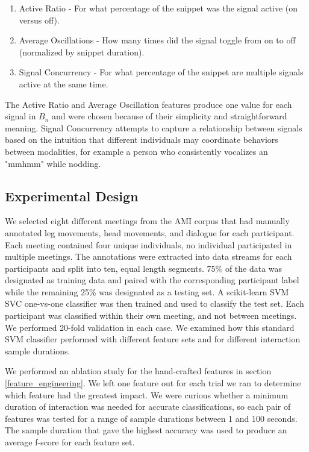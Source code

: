 \documentclass[conference]{IEEEtran}
\newcommand{\meta}[1]{{\textcolor[rgb]{0.1,0.7,0.2}{[JSS: {\it #1}]}}}
\begin{document}
\begin{enumerate}
    \item Active Ratio - For what percentage of the snippet was the signal active (on versus off).
    \item Average Oscillations - How many times did the signal toggle from on to off (normalized by snippet duration). 
    \item Signal Concurrency - For what percentage of the snippet are multiple signals active at the same time. 
\end{enumerate}

The Active Ratio and Average Oscillation features produce one value for each signal in $B_n$ and were chosen because of their simplicity and straightforward meaning. Signal Concurrency attempts to capture a relationship between signals based on the intuition that different individuals may coordinate behaviors between modalities, for example a person who consistently vocalizes an "mmhmm" while nodding. 


\subsection{Experimental Design}

We selected eight different meetings from the AMI corpus that had manually annotated leg movements, head movements, and dialogue for each participant. Each meeting contained four unique individuals, no individual participated in multiple meetings. The annotations were extracted into data streams for each participants and split into ten, equal length segments. 75\% of the data was designated as training data and paired with the corresponding participant label while the remaining 25\% was designated as a testing set. A scikit-learn SVM SVC one-vs-one classifier was then trained and used to classify the test set. Each participant was classified within their own meeting, and not between meetings. We performed 20-fold validation in each case. We examined how this standard SVM classifier performed with different feature sets and for different interaction sample durations. 

We performed an ablation study for the hand-crafted features in section \ref{feature_engineering}. We left one feature out for each trial we ran to determine which feature had the greatest impact. We were curious whether a minimum duration of interaction was needed for accurate classifications, so each pair of features was tested for a range of sample durations between 1 and 100 seconds. The sample duration that gave the highest accuracy was used to produce an average f-score for each feature set. 
\end{document}

